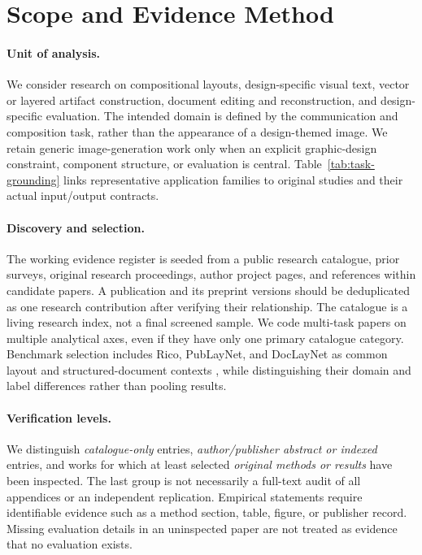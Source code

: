\section{Scope and Evidence Method}
\label{sec:scope}
\paragraph{Unit of analysis.}
We consider research on compositional layouts, design-specific visual text, vector or layered artifact construction, document editing and reconstruction, and design-specific evaluation. The intended domain is defined by the communication and composition task, rather than the appearance of a design-themed image. We retain generic image-generation work only when an explicit graphic-design constraint, component structure, or evaluation is central. Table~\ref{tab:task-grounding} links representative application families to original studies and their actual input/output contracts.



\paragraph{Discovery and selection.}
The working evidence register is seeded from a public research catalogue, prior surveys, original research proceedings, author project pages, and references within candidate papers. A publication and its preprint versions should be deduplicated as one research contribution after verifying their relationship. The catalogue is a living research index, not a final screened sample. We code multi-task papers on multiple analytical axes, even if they have only one primary catalogue category. Benchmark selection includes Rico, PubLayNet, and DocLayNet as common layout and structured-document contexts \citep{rico2017,publaynet2019,doclaynet2022}, while distinguishing their domain and label differences rather than pooling results.

\paragraph{Verification levels.}
We distinguish \emph{catalogue-only} entries, \emph{author/publisher abstract or indexed} entries, and works for which at least selected \emph{original methods or results} have been inspected. The last group is not necessarily a full-text audit of all appendices or an independent replication. Empirical statements require identifiable evidence such as a method section, table, figure, or publisher record. Missing evaluation details in an uninspected paper are not treated as evidence that no evaluation exists.

